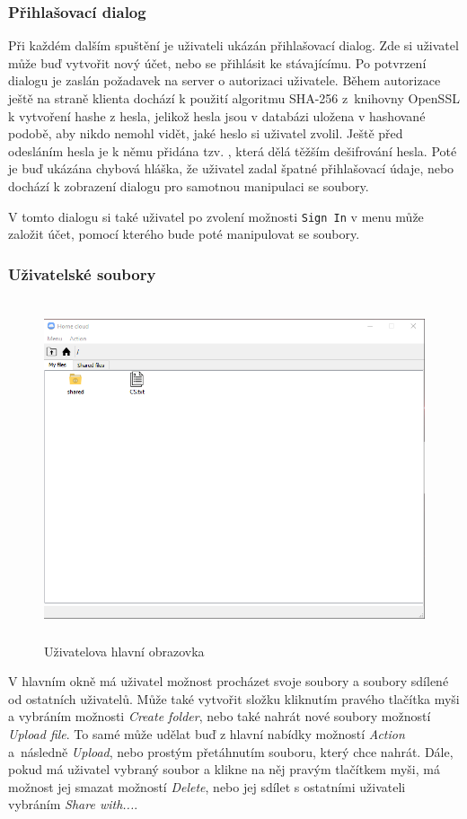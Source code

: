 \documentclass[
  glossaries,
]{kidiplom}
\begin{document}
\subsubsection{Přihlašovací dialog}
Při každém dalším spuštění je uživateli ukázán přihlašovací dialog. Zde si uživatel může buď vytvořit nový účet, nebo se přihlásit ke stávajícímu. Po potvrzení dialogu je zaslán požadavek na server o autorizaci uživatele. Během autorizace ještě na straně klienta dochází k použití algoritmu SHA-256 \cite{SHA256} z~knihovny OpenSSL \cite{OPENSSL} k vytvoření hashe z hesla, jelikož hesla jsou v databázi uložena v hashované podobě, aby nikdo nemohl vidět, jaké heslo si uživatel zvolil. Ještě před odesláním hesla je k němu přidána tzv. , která dělá těžším dešifrování hesla. Poté je buď ukázána chybová hláška, že uživatel zadal špatné přihlašovací údaje, nebo dochází k zobrazení dialogu pro samotnou manipulaci se soubory.

V tomto dialogu si také uživatel po zvolení možnosti \texttt{Sign~In} v menu může založit účet, pomocí kterého bude poté manipulovat se soubory.
\subsubsection{Uživatelské soubory}
\begin{figure}[H]
    \centering
    \includegraphics[width=14cm,height=10cm,keepaspectratio]{MainWindow}
    \caption{Uživatelova hlavní obrazovka}
    \label{fig:usersworkspace}
\end{figure}
V hlavním okně má uživatel možnost procházet svoje soubory a soubory sdílené od ostatních uživatelů. Může také vytvořit složku kliknutím pravého tlačítka myši a vybráním možnosti \textit{Create folder}, nebo také nahrát nové soubory možností \textit{Upload file}. To samé může udělat buď z hlavní nabídky možností \textit{Action} a~následně \textit{Upload}, nebo prostým přetáhnutím souboru, který chce nahrát. Dále, pokud má uživatel vybraný soubor a klikne na něj pravým tlačítkem myši, má možnost jej smazat možností \textit{Delete}, nebo jej sdílet s ostatními uživateli vybráním \textit{Share with...}.
\end{document}
